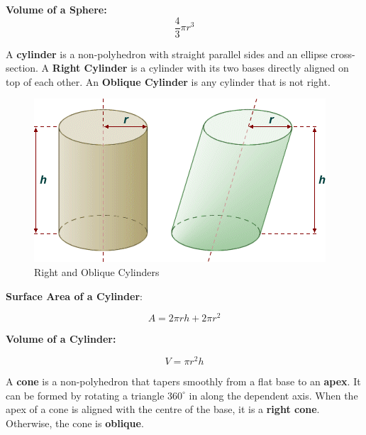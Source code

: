 \documentclass{article}
\begin{document}
            \noindent \color{purple} \textbf{Volume of a Sphere:} \color{black} \\

            \begin{equation*}
                \frac{4}{3}\pi r^3
            \end{equation*}

            \noindent A \textbf{cylinder} is a non-polyhedron with straight parallel sides and an
            ellipse cross-section. A \textbf{Right Cylinder} is a cylinder with its two bases
            directly aligned on top of each other. An \textbf{Oblique Cylinder} is any cylinder
            that is not right.

            \begin{figure} [hbt!]
                \centering
                \includegraphics[scale=0.5]{Resources/Unit6Solids/cylinders.png}
                \caption*{Right and Oblique Cylinders}
            \end{figure}

            \noindent \color{purple} \textbf{Surface Area of a Cylinder}: \color{black}

            \begin{equation*}
                A=2\pi rh+2\pi r^2
            \end{equation*}

            \noindent \color{purple} \textbf{Volume of a Cylinder:} \color{black}

            \begin{equation*}
                V=\pi r^2 h
            \end{equation*}

            \noindent A \textbf{cone} is a non-polyhedron that tapers smoothly from a flat base
            to an \textbf{apex}. It can be formed by rotating a triangle $360^\circ$ in along
            the dependent axis. When the apex of a cone is aligned with the centre of the base,
            it is a \textbf{right cone}. Otherwise, the cone is \textbf{oblique}. \\
\end{document}
